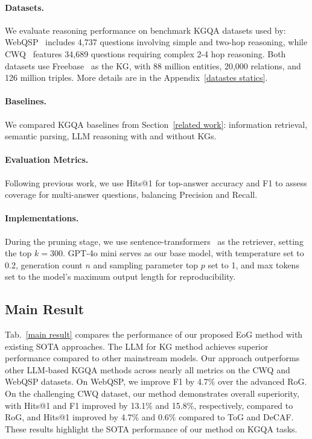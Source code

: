\documentclass[11pt]{article}
\begin{document}
\paragraph{Datasets.}We evaluate reasoning performance on benchmark KGQA datasets used by: WebQSP~\cite{DBLP:conf/acl/YihRMCS16} includes 4,737 questions involving simple and two-hop reasoning, while CWQ~\cite{Talmor2018TheWA} features 34,689 questions requiring complex 2-4 hop reasoning. Both datasets use Freebase~\cite{Bollacker2008FreebaseAC} as the KG, with 88 million entities, 20,000 relations, and 126 million triples. More details are in the Appendix~\ref{datastes statics}.
\paragraph{Baselines.} We compared KGQA baselines from Section~\ref{related work}: information retrieval, semantic parsing, LLM reasoning with and without KGs.
\paragraph{Evaluation Metrics.}
Following previous work, we use Hits@1 for top-answer accuracy and F1 to assess coverage for multi-answer questions, balancing Precision and Recall.
\paragraph{Implementations.}During the pruning stage, we use sentence-transformers~\cite{reimers2019sentencebertsentenceembeddingsusing} as the retriever, setting the top $k = 300$. GPT-4o mini serves as our base model, with temperature set to 0.2, generation count $n$ and sampling parameter top $p$ set to 1, and max tokens set to the model’s maximum output length for reproducibility.
\subsection{Main Result}

Tab.~\ref{main result} compares the performance of our proposed EoG method with existing SOTA approaches. The LLM for KG method achieves superior performance compared to other mainstream models. Our approach outperforms other LLM-based KGQA methods across nearly all metrics on the CWQ and WebQSP datasets. On WebQSP, we improve F1 by 4.7\% over the advanced RoG. On the challenging CWQ dataset, our method demonstrates overall superiority, with Hits@1 and F1 improved by 13.1\% and 15.8\%, respectively, compared to RoG, and Hits@1 improved by 4.7\% and 0.6\% compared to ToG and DeCAF. These results highlight the SOTA performance of our method on KGQA tasks.
\end{document}
